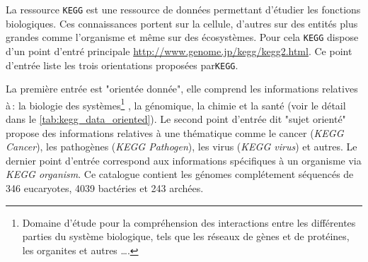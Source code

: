\begin{refsegment}
    La ressource \texttt{\gls{KEGG}} \cite{ogata1999kegg,kanehisa2000kegg,kanehisa2002kegg,kanehisa2004kegg,aoki2005using,kanehisa2010kegg,kanehisa2017kegg} est une ressource de données permettant d'étudier les fonctions biologiques. Ces connaissances portent sur la cellule, d'autres sur des entités plus grandes comme l'organisme et même sur  des écosystèmes. Pour cela \texttt{\gls{KEGG}} dispose d'un point d'entré principale \url{http://www.genome.jp/kegg/kegg2.html}. Ce point d'entrée liste les trois orientations proposées par\texttt{\gls{KEGG}}.
    
    La première entrée est "orientée donnée", elle comprend les informations relatives à : la biologie des systèmes\footnote{Domaine d'étude pour la compréhension des interactions entre les différentes parties du système biologique, tels que les réseaux de gènes et de protéines, les organites et autres \ldots. } , la génomique, la chimie et la santé (voir le détail dans le \cref{tab:kegg_data_oriented}). Le second point d'entrée dit "sujet orienté" propose des informations relatives à une thématique comme le cancer (\textit{KEGG Cancer}), les pathogènes (\textit{KEGG Pathogen}), les virus (\textit{KEGG virus}) et autres. Le dernier point d'entrée correspond aux informations spécifiques à un organisme via \textit{KEGG organism}. Ce catalogue contient les génomes complétement séquencés de 346 eucaryotes, 4039 bactéries et 243 archées.  
    

\end{refsegment}
